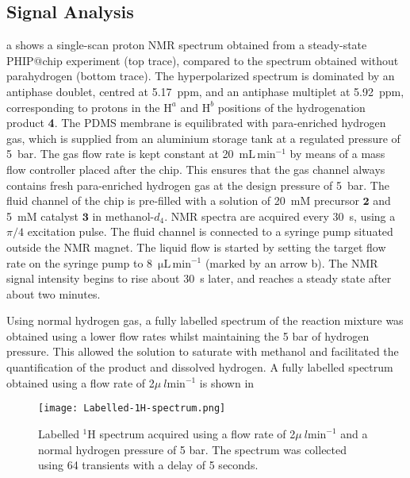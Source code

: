 \subsection{Signal Analysis}

a shows a single-scan proton NMR spectrum
obtained from a steady-state PHIP@chip experiment (top trace), compared
to the spectrum obtained without parahydrogen (bottom trace).
The hyperpolarized spectrum is dominated by an antiphase doublet,
centred at 5.17~ppm, and an antiphase multiplet at 5.92~ppm, corresponding to
protons in the $\mathrm{H}^a$ and $\mathrm{H}^b$ positions of the
hydrogenation product \textbf{4}.
The PDMS membrane is equilibrated with para-enriched hydrogen gas, which is
supplied from an aluminium storage tank at a regulated pressure of 5~bar. The
gas flow rate is kept constant at 20~$\text{mL}\,\text{min}^{-1}$ by means of a
mass flow controller placed after the chip. This ensures that the gas channel
always contains fresh para-enriched hydrogen gas at the design pressure of
5~bar. The fluid channel of the chip is pre-filled with a solution of 20~mM
precursor $\mathbf{2}$ and 5~mM catalyst $\mathbf{3}$ in methanol-$d_4$. NMR
spectra are acquired every 30~s, using a $\pi/4$ excitation pulse.  The fluid
channel is connected to a syringe pump situated outside the NMR magnet.
The
liquid flow is started by setting the target flow rate on the syringe pump to
8~$\mathrm{\mu L\,\text{min}^{-1}}$ (marked by an arrow b).
The NMR signal intensity begins to rise about 30~s later, and reaches a steady
state after about two minutes.

Using normal hydrogen gas, a fully labelled spectrum of the reaction mixture
was obtained using a lower flow rates whilst maintaining
the 5 bar of hydrogen pressure. This allowed the solution to saturate with
methanol and facilitated the quantification of the product and dissolved hydrogen.
A fully labelled spectrum obtained using a flow rate of 2$\mu~l \text{min}^{-1}$
is shown in 

\begin{figure}
  \begin{center}
  \texttt{[image: Labelled-1H-spectrum.png]}
  \end{center}
  \caption{Labelled $^1$H spectrum acquired using a flow rate of 2$\mu~l \text{min}^{-1}$
  and a normal hydrogen pressure of 5 bar. The spectrum was collected using 64 transients
  with a delay of 5 seconds.}
  \label{fig:LabelledSpec}
\end{figure}

